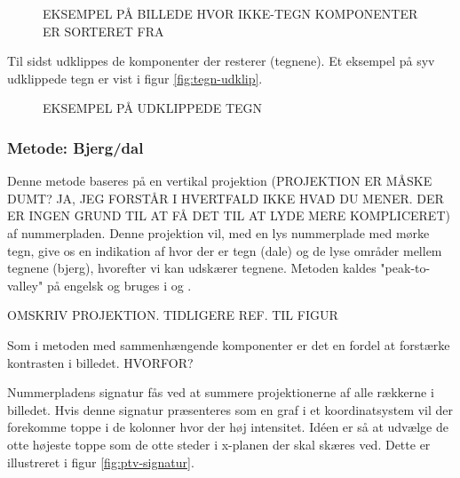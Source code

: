 \begin{figure}[htp]
  \centering
  \caption{EKSEMPEL PÅ BILLEDE HVOR IKKE-TEGN KOMPONENTER ER SORTERET FRA}
  \label{fig:sorterede-concomp}
\end{figure}

Til sidst udklippes de komponenter der resterer (tegnene). Et eksempel på syv udklippede tegn er vist i figur \vref{fig:tegn-udklip}.

\begin{figure}[htp]
  \centering
  \caption{EKSEMPEL PÅ UDKLIPPEDE TEGN}
  \label{fig:tegn-udklip}
\end{figure}

\subsubsection*{Metode: Bjerg/dal}
Denne metode baseres på en vertikal projektion (PROJEKTION ER MÅSKE DUMT? JA, JEG FORSTÅR I HVERTFALD IKKE HVAD DU MENER. DER ER INGEN GRUND TIL AT FÅ DET TIL AT LYDE MERE KOMPLICERET) af nummerpladen. Denne projektion vil, med en lys nummerplade med mørke tegn, give os en indikation af hvor der er tegn (dale) og de lyse områder mellem tegnene (bjerg), hvorefter vi kan udskærer tegnene. Metoden kaldes "peak-to-valley" på engelsk og bruges i \cite{ron} og \cite{kwas}.

OMSKRIV PROJEKTION. TIDLIGERE REF. TIL FIGUR

Som i metoden med sammenhængende komponenter er det en fordel at forstærke kontrasten i billedet. HVORFOR?

Nummerpladens signatur fås ved at summere projektionerne af alle rækkerne i billedet. Hvis denne signatur præsenteres som en graf i et koordinatsystem vil der forekomme toppe i de kolonner hvor der høj intensitet. Idéen er så at udvælge de otte højeste toppe som de otte steder i x-planen der skal skæres ved. Dette er illustreret i figur \vref{fig:ptv-signatur}.

